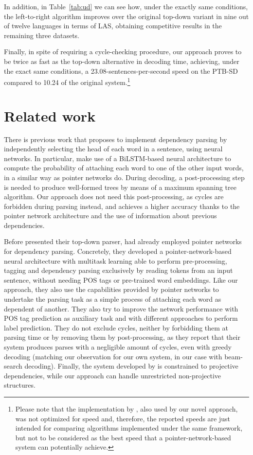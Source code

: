 \documentclass[11pt,a4paper]{article}
\begin{document}
In addition, in Table~\ref{tab:ud} we can see how, under the exactly same conditions, the left-to-right algorithm improves over the original top-down variant in nine out of twelve languages in terms of LAS, obtaining competitive results in the remaining three datasets. 

Finally, in spite of requiring a cycle-checking procedure, our approach proves to be twice as fast as the top-down alternative in decoding time, achieving, under the exact same conditions, a 23.08-sentences-per-second speed on the PTB-SD compared to 10.24 of the original system.\footnote{Please note that the implementation by \citet{Ma18}, also used by our novel approach, was not optimized 
for speed
and, therefore, the reported speeds are just intended for comparing algorithms implemented under the same framework, but not to be considered as the best speed that a pointer-network-based system can potentially achieve.}

\section{Related work}
There 
is previous work that proposes to implement dependency parsing by independently selecting the head of each word in a sentence, using neural networks.
In particular, \citet{Zhang17} make use of a BiLSTM-based neural architecture to 
compute the probability of attaching each word to one of the other input words, in a similar way as pointer networks do. 
During decoding, a post-processing step is needed to produce well-formed trees by means of a maximum spanning tree algorithm. 
Our approach does not need this post-processing, as cycles are forbidden during parsing instead, and achieves a higher accuracy thanks to the pointer network architecture and the use of information about previous dependencies.


Before \citet{Ma18} presented their top-down parser, \citet{Chorowski17} had already employed pointer networks \cite{Vinyals15} for dependency parsing. Concretely, they developed a pointer-network-based neural architecture with multitask learning able to perform pre-processing, tagging and dependency parsing exclusively by reading tokens from an input sentence, 
without needing
POS tags or pre-trained word embeddings. Like our approach, they also use the capabilities provided by pointer networks to undertake the parsing task as a simple process of attaching each word 
as dependent of another.
They also try to improve the network performance with POS tag prediction as auxiliary task and with different approaches to perform label prediction. 
They do not exclude cycles, neither by forbidding them at parsing time or by removing them by post-processing, as they report that their system produces parses with a negligible amount of cycles, even with greedy decoding (matching our observation for our own system, in our case with beam-search decoding).
Finally, the system developed by \citet{Chorowski17} is constrained to projective dependencies, while our approach can handle unrestricted non-projective structures.
\end{document}
